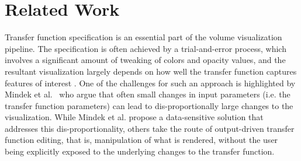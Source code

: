 \documentclass[twoside,twocolumn,10pt]{article}
\begin{document}

\section{Related Work}

Transfer function specification is an essential part of the volume visualization pipeline.
The specification is often achieved by a trial-and-error process, which involves a significant amount of tweaking of colors and opacity values, and the resultant visualization largely depends on how well the transfer function captures features of interest \cite{kniss_multidimensional_2002}.
One of the challenges for such an approach is highlighted by Mindek et al.~\cite{mindek_data-sensitive_2017} who argue that often small changes in input parameters (i.e. the transfer function parameters) can lead to dis-proportionally large changes to the visualization. While Mindek et al. propose a data-sensitive solution that addresses this dis-proportionality, others take the route of output-driven transfer function editing, that is, manipulation of what is rendered, without the user being explicitly exposed to the underlying changes to the transfer function.



\end{document}
